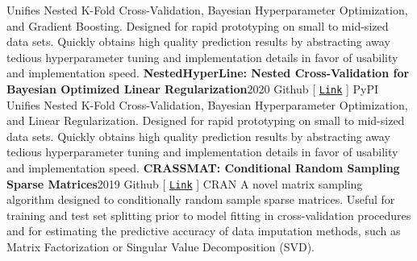 \documentclass{article}
\begin{document}
        Unifies Nested K-Fold Cross-Validation, Bayesian Hyperparameter Optimization, and Gradient Boosting. Designed for rapid prototyping on small to mid-sized data sets. Quickly obtains high quality prediction results by abstracting away tedious hyperparameter tuning and implementation details in favor of usability and implementation speed.\newline\newline
        \textbf{NestedHyperLine: Nested Cross-Validation for Bayesian Optimized Linear Regularization}\hfill{2020}\newline
        \faGithub\space Github [ \href{https://github.com/nickkunz/nestedhyperline}{\texttt{Link}} ] \space\faPython\space PyPI\newline\newline
        Unifies Nested K-Fold Cross-Validation, Bayesian Hyperparameter Optimization, and Linear Regularization. Designed for rapid prototyping on small to mid-sized data sets. Quickly obtains high quality prediction results by abstracting away tedious hyperparameter tuning and implementation details in favor of usability and implementation speed.\newline\newline
        \textbf{CRASSMAT: Conditional Random Sampling Sparse Matrices}\hfill{2019}\newline
        \faGithub\space Github [ \href{https://github.com/nickkunz/crassmat}{\texttt{Link}} ] \space\faRProject\space CRAN\newline\newline
        A novel matrix sampling algorithm designed to conditionally random sample sparse matrices. Useful for training and test set splitting prior to model fitting in cross-validation procedures and for estimating the predictive accuracy of data imputation methods, such as Matrix Factorization or Singular Value Decomposition (SVD).
\newpage
\end{document}
